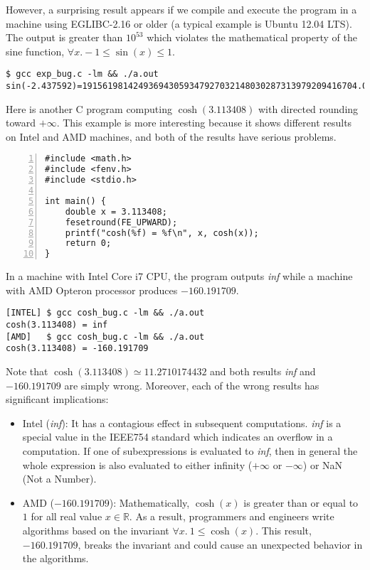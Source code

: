 \documentclass{llncs}
\begin{document}
However, a surprising result appears if we compile and execute the
program in a machine using EGLIBC-2.16 or older (a typical example is
Ubuntu 12.04 LTS). The output is greater than $10^{53}$ which violates
the mathematical property of the sine function,
$\forall x. -1 \le \sin(x) \le 1$.

\begin{Verbatim}[frame=single, fontsize=\relsize{-1}]
$ gcc exp_bug.c -lm && ./a.out
sin(-2.437592)=191561981424936943059347927032148030287313979209416704.00
\end{Verbatim}

Here is another C program computing $\cosh(3.113408)$ with directed
rounding toward $+\infty$. This example is more interesting because it
shows different results on Intel and AMD machines, and both of the
results have serious problems.

\begin{Verbatim}[numbers=left, frame=single, fontsize=\relsize{-1}]
#include <math.h>
#include <fenv.h>
#include <stdio.h>

int main() {
    double x = 3.113408;
    fesetround(FE_UPWARD);
    printf("cosh(%f) = %f\n", x, cosh(x));
    return 0;
}
\end{Verbatim}

In a machine with Intel Core i7 CPU, the program outputs
\textit{inf} while a machine with AMD Opteron processor produces
$-160.191709$.

\begin{Verbatim}[frame=single, fontsize=\relsize{-1}]
[INTEL] $ gcc cosh_bug.c -lm && ./a.out
cosh(3.113408) = inf
[AMD]   $ gcc cosh_bug.c -lm && ./a.out
cosh(3.113408) = -160.191709
\end{Verbatim}

Note that $\cosh(3.113408) \simeq 11.2710174432$ and both results
\textit{inf} and $-160.191709$ are simply wrong. Moreover, each of the
wrong results has significant implications:

\begin{itemize}
\item Intel (\textit{inf}): It has a contagious effect in subsequent
  computations. \textit{inf} is a special value in the IEEE754
  standard which indicates an overflow in a computation. If one of
  subexpressions is evaluated to \textit{inf}, then in general the
  whole expression is also evaluated to either infinity ($+\infty$ or
  $-\infty$) or NaN (Not a Number).
\item AMD ($-160.191709$): Mathematically, $\cosh(x)$ is greater than or
  equal to $1$ for all real value $x \in \mathbb{R}$. As a result, programmers
  and engineers write algorithms based on the invariant $\forall x. \
  1 \le \cosh(x)$. This result, $-160.191709$, breaks the invariant
  and could cause an unexpected behavior in the algorithms.
\end{itemize}
\end{document}
